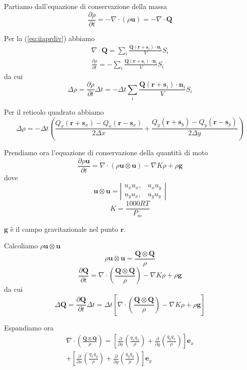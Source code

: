 \documentclass[a4paper,11pt]{article}
\begin{document}
Partiamo dall'equazione di conservazione della massa
\[
  \frac{\partial \rho}{\partial t} = - \nabla \cdot (\rho \mathbf{u}) =
  - \nabla \cdot \mathbf{Q}
\]

Per la (\ref{eq:iiaprdiv}) abbiamo
\[
\begin{array}{r}
  \nabla \cdot \mathbf{Q} =
    \sum_i \frac{\mathbf{Q} (\mathbf{r}+\mathbf{s}_i) \cdot \mathbf{n}_i}{V} S_i
  \\
  \frac{\partial \rho}{\partial t} = - \sum_i \frac{\mathbf{Q} (\mathbf{r}+\mathbf{s}_i) \cdot \mathbf{n}_i}{V} S_i
\end{array}
\]
da cui
\[
  \Delta \rho = \frac{\partial \rho}{\partial t} \Delta t = 
  - \Delta t \sum_i \frac{\mathbf{Q} (\mathbf{r}+\mathbf{s}_i) \cdot \mathbf{n}_i}{V} S_i
\]

Per il reticolo quadrato abbiamo
\begin{equation}
	\label{eq:deltarho}
  \Delta \rho
  = - \Delta t 
  \left(
   \frac{Q_x(\mathbf{r}+\mathbf{s}_x) - Q_x(\mathbf{r}-\mathbf{s}_x)}{2 \Delta x} +
   \frac{Q_y(\mathbf{r}+\mathbf{s}_y) - Q_y(\mathbf{r}-\mathbf{s}_y)}{2 \Delta y}
   \right)
\end{equation}

Prendiamo ora l'equazione di conservazione della quantità di moto
\[
  \frac{\partial \rho \mathbf{u}}{\partial t} = \nabla \cdot \left( \rho \mathbf{u} \otimes \mathbf{u} \right) - \nabla K \rho + \rho \mathbf{g} 
\]
dove
\[
  \mathbf{u} \otimes \mathbf{u} = \left|
  \begin{array}{rrr}
    u_x u_x, & u_x u_y
    \\
    u_y u_x, & u_y u_y
  \end{array}
  \right|
\]
\[
  K = \frac{1000 R T}{P_m}
\]

$ \mathbf{g} $ è il campo gravitazionale nel punto $ \mathbf{r} $.

Calcoliamo $ \rho \mathbf{u} \otimes \mathbf{u} $
\[
	\rho \mathbf{u} \otimes \mathbf{u} = \frac{\mathbf{Q} \otimes \mathbf{Q}}{\rho}
\]
\[
  \frac{\partial \mathbf{Q}}{\partial t} =
    \nabla \cdot \left( \frac{\mathbf{Q} \otimes \mathbf{Q}}{\rho} \right) - \nabla K \rho + \rho \mathbf{g} 
\]
da cui
\[
  \Delta \mathbf{Q} = \frac{\partial \mathbf{Q}}{\partial t} \Delta t =
    \Delta t \left[ \nabla \cdot \left( \frac{\mathbf{Q} \otimes \mathbf{Q}}{\rho} \right) - \nabla K \rho + \rho \mathbf{g} \right]
\]

Espandiamo ora
\[
\begin{array}{r}
	\nabla \cdot \left( \frac{\mathbf{Q} \otimes \mathbf{Q}}{\rho} \right)
	= \left[
	\frac{\partial}{\partial x} \left( \frac{q_x q_x}{\rho} \right)
	+ \frac{\partial}{\partial y} \left( \frac{q_y q_x}{\rho} \right)
	\right] \mathbf{e}_x
	\\
	+ \left[
	\frac{\partial}{\partial x} \left( \frac{q_x q_y}{\rho} \right)
	+ \frac{\partial}{\partial y} \left( \frac{q_y q_y}{\rho} \right)
	\right] \mathbf{e}_y
\end{array}
\]
\end{document}
